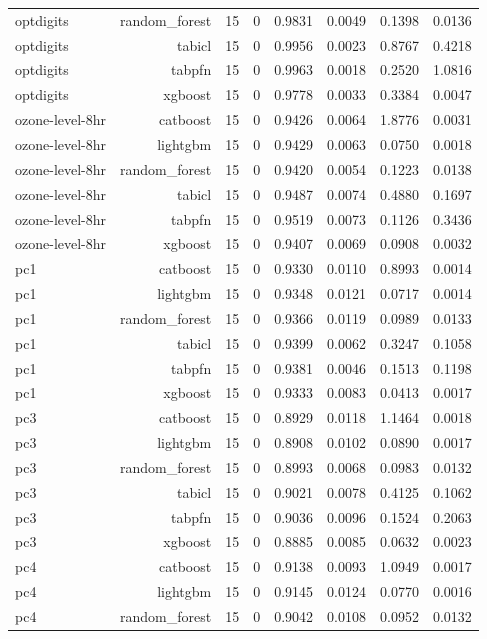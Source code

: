 \begin{table}[htbp]
\begin{tabular}{lrrrrrrr}
optdigits & random\_forest & 15 & 0 & 0.9831 & 0.0049 & 0.1398 & 0.0136 \\
optdigits & tabicl & 15 & 0 & 0.9956 & 0.0023 & 0.8767 & 0.4218 \\
optdigits & tabpfn & 15 & 0 & 0.9963 & 0.0018 & 0.2520 & 1.0816 \\
optdigits & xgboost & 15 & 0 & 0.9778 & 0.0033 & 0.3384 & 0.0047 \\
ozone-level-8hr & catboost & 15 & 0 & 0.9426 & 0.0064 & 1.8776 & 0.0031 \\
ozone-level-8hr & lightgbm & 15 & 0 & 0.9429 & 0.0063 & 0.0750 & 0.0018 \\
ozone-level-8hr & random\_forest & 15 & 0 & 0.9420 & 0.0054 & 0.1223 & 0.0138 \\
ozone-level-8hr & tabicl & 15 & 0 & 0.9487 & 0.0074 & 0.4880 & 0.1697 \\
ozone-level-8hr & tabpfn & 15 & 0 & 0.9519 & 0.0073 & 0.1126 & 0.3436 \\
ozone-level-8hr & xgboost & 15 & 0 & 0.9407 & 0.0069 & 0.0908 & 0.0032 \\
pc1 & catboost & 15 & 0 & 0.9330 & 0.0110 & 0.8993 & 0.0014 \\
pc1 & lightgbm & 15 & 0 & 0.9348 & 0.0121 & 0.0717 & 0.0014 \\
pc1 & random\_forest & 15 & 0 & 0.9366 & 0.0119 & 0.0989 & 0.0133 \\
pc1 & tabicl & 15 & 0 & 0.9399 & 0.0062 & 0.3247 & 0.1058 \\
pc1 & tabpfn & 15 & 0 & 0.9381 & 0.0046 & 0.1513 & 0.1198 \\
pc1 & xgboost & 15 & 0 & 0.9333 & 0.0083 & 0.0413 & 0.0017 \\
pc3 & catboost & 15 & 0 & 0.8929 & 0.0118 & 1.1464 & 0.0018 \\
pc3 & lightgbm & 15 & 0 & 0.8908 & 0.0102 & 0.0890 & 0.0017 \\
pc3 & random\_forest & 15 & 0 & 0.8993 & 0.0068 & 0.0983 & 0.0132 \\
pc3 & tabicl & 15 & 0 & 0.9021 & 0.0078 & 0.4125 & 0.1062 \\
pc3 & tabpfn & 15 & 0 & 0.9036 & 0.0096 & 0.1524 & 0.2063 \\
pc3 & xgboost & 15 & 0 & 0.8885 & 0.0085 & 0.0632 & 0.0023 \\
pc4 & catboost & 15 & 0 & 0.9138 & 0.0093 & 1.0949 & 0.0017 \\
pc4 & lightgbm & 15 & 0 & 0.9145 & 0.0124 & 0.0770 & 0.0016 \\
pc4 & random\_forest & 15 & 0 & 0.9042 & 0.0108 & 0.0952 & 0.0132 \\

\end{tabular}
\end{table}
